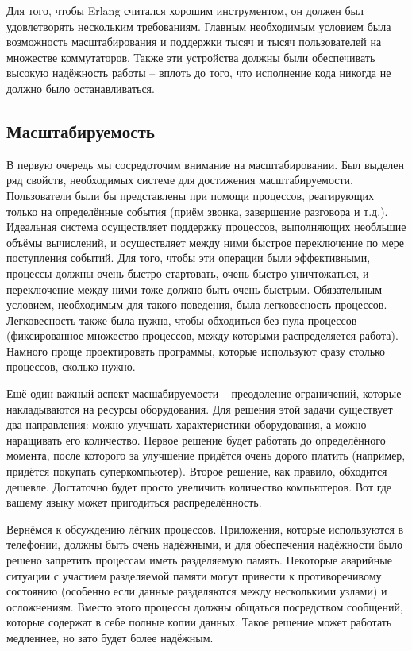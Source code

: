 Для того, чтобы Erlang считался хорошим инструментом, он должен был удовлетворять нескольким требованиям.
Главным необходимым условием была возможность масштабирования и поддержки тысяч и тысяч пользователей на множестве коммутаторов.
Также эти устройства должны были обеспечивать высокую надёжность работы \--- вплоть до того, что исполнение кода никогда не должно было останавливаться.

\subsection{Масштабируемость}
\label{scalability}
В первую очередь мы сосредоточим внимание на масштабировании.
Был выделен ряд свойств, необходимых системе для достижения масштабируемости.
Пользователи были бы представлены при помощи процессов, реагирующих только на определённые события (приём звонка, завершение разговора и т.д.).
Идеальная система осуществляет поддержку процессов, выполняющих необльшие объёмы вычислений, и осуществляет между ними быстрое переключение по мере поступления событий. 
Для того, чтобы эти операции были эффективными, процессы должны очень быстро стартовать, очень быстро уничтожаться, и переключение между ними тоже должно быть очень быстрым.
Обязательным условием, необходимым для такого поведения, была легковесность процессов.
Легковесность также была нужна, чтобы обходиться без пула процессов (фиксированное множество процессов, между которыми распределяется работа).
Намного проще проектировать программы, которые используют сразу столько процессов, сколько нужно.

Ещё один важный аспект масшабируемости \--- преодоление ограничений, которые накладываются на ресурсы оборудования.
Для решения этой задачи существует два направления: можно улучшать характеристики оборудования, а можно наращивать его количество.
Первое решение будет работать до определённого момента, после которого за улучшение придётся очень дорого платить (например, придётся покупать суперкомпьютер).
Второе решение, как правило, обходится дешевле.
Достаточно будет просто увеличить количество компьютеров.
Вот где вашему языку может пригодиться распределённость.

Вернёмся к обсуждению лёгких процессов.
Приложения, которые используются в телефонии, должны быть очень надёжными, и для обеспечения надёжности было решено запретить процессам иметь разделяемую память.
Некоторые аварийные ситуации с участием разделяемой памяти могут привести к противоречивому состоянию (особенно если данные разделяются между несколькими узлами) и осложнениям.
Вместо этого процессы должны общаться посредством сообщений, которые содержат в себе полные копии данных.
Такое решение может работать медленнее, но зато будет более надёжным.
